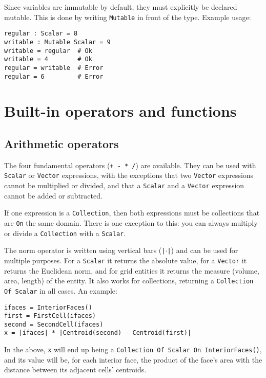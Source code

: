 \documentclass[11pt]{article}
\newcommand{\code}[1]{\texttt{#1}}
\begin{document}
Since variables are immutable by default, they must explicitly be declared mutable. This
is done by writing \code{Mutable} in front of the type. Example usage:

\begin{verbatim}
regular : Scalar = 8
writable : Mutable Scalar = 9
writable = regular  # Ok
writable = 4        # Ok
regular = writable  # Error
regular = 6         # Error
\end{verbatim}


\section{Built-in operators and functions}

\subsection{Arithmetic operators}

The four fundamental operators (\code{+ - * /}) are available. They can be used with
\code{Scalar} or \code{Vector} expressions, with the exceptions that two \code{Vector}
expressions cannot be multiplied or divided, and that a \code{Scalar} and a \code{Vector}
expression cannot be added or subtracted.

If one expression is a \code{Collection}, then both expressions must be collections that
are \code{On} the same domain. There is one exception to this: you can always multiply or
divide a \code{Collection} with a \code{Scalar}.

The norm operator is written using vertical bars (\code{|}$\cdot$\code{|}) and can be used
for multiple purposes. For a \code{Scalar} it returns the absolute value, for a
\code{Vector} it returns the Euclidean norm, and for grid entities it returns the measure
(volume, area, length) of the entity. It also works for collections, returning a
\code{Collection Of Scalar} in all cases. An example:

\begin{verbatim}
ifaces = InteriorFaces()
first = FirstCell(ifaces)
second = SecondCell(ifaces)
x = |ifaces| * |Centroid(second) - Centroid(first)|
\end{verbatim}

In the above, \code{x} will end up being a \code{Collection Of Scalar On InteriorFaces()},
and its value will be, for each interior face, the product of the face's area with the
distance between its adjacent cells' centroids.
\end{document}
